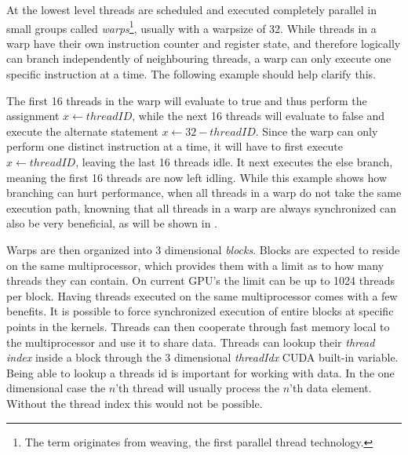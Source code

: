 
At the lowest level threads are scheduled and executed completely
parallel in small groups called \textit{warps}\footnote{The term
  originates from weaving, the first parallel thread
  technology.}, usually with a warpsize of 32. While
threads in a warp have their own instruction counter and register
state, and therefore logically can branch independently of
neighbouring threads, a warp can only execute one specific instruction
at a time. The following example should help clarify this.

\begin{algorithmic}
  \ELSE
  \ENDIF
\end{algorithmic}


The first 16 threads in the warp will evaluate to true and thus
perform the assignment $x \leftarrow threadID$, while the next 16
threads will evaluate to false and execute the alternate statement $x
\leftarrow 32 - threadID$. Since the warp can only perform one
distinct instruction at a time, it will have to first execute $x
\leftarrow threadID$, leaving the last 16 threads idle. It next
executes the else branch, meaning the first 16 threads are now left
idling. While this example shows how branching can hurt performance,
when all threads in a warp do not take the same execution path,
knowning that all threads in a warp are always synchronized can also
be very beneficial, as will be shown in
.



Warps are then organized into 3 dimensional \textit{blocks}. Blocks
are expected to reside on the same multiprocessor, which provides them
with a limit as to how many threads they can contain. On current GPU's
the limit can be up to 1024 threads per block. Having threads executed
on the same multiprocessor comes with a few benefits. It is possible
to force synchronized execution of entire blocks at specific points in
the kernels. Threads can then cooperate through fast memory local to
the multiprocessor and use it to share data. Threads can lookup their
\textit{thread index} inside a block through the 3 dimensional
\textit{threadIdx} CUDA built-in variable. Being able to lookup a
threads id is important for working with data. In the one dimensional
case the $n$'th thread will usually process the $n$'th data
element. Without the thread index this would not be possible.

